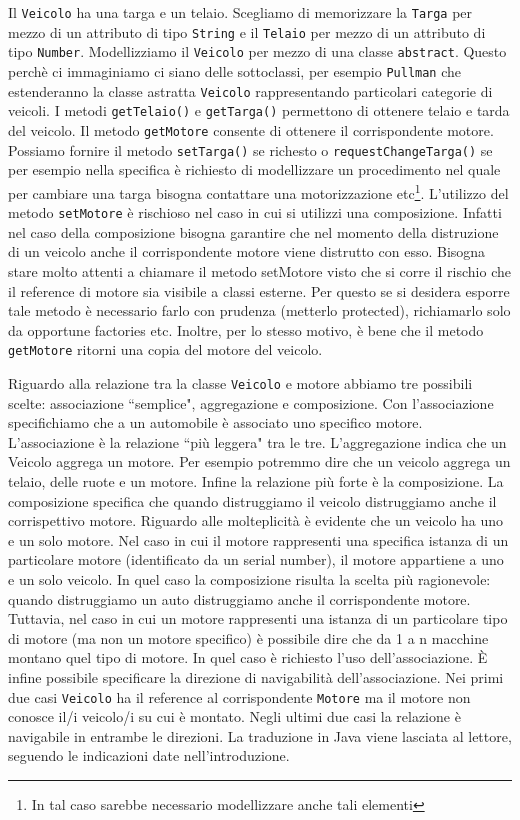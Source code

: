 \documentclass{article}
\begin{document}
Il \texttt{Veicolo} ha una targa e un telaio. Scegliamo di memorizzare la \texttt{Targa} per mezzo di un attributo di tipo \texttt{String} e il \texttt{Telaio} per mezzo di un attributo di tipo \texttt{Number}. Modellizziamo il \texttt{Veicolo} per mezzo di una classe \texttt{abstract}. Questo perch\`e ci immaginiamo ci siano delle sottoclassi, per esempio \texttt{Pullman} che estenderanno la classe astratta \texttt{Veicolo} rappresentando particolari categorie di veicoli. I metodi \texttt{getTelaio()} e \texttt{getTarga()} permettono di ottenere telaio e tarda del veicolo. Il metodo \texttt{getMotore} consente di ottenere il corrispondente motore. Possiamo fornire il metodo \texttt{setTarga()} se richesto o \texttt{requestChangeTarga()} se per esempio nella specifica \`e richiesto di modellizzare un procedimento nel quale per cambiare una targa bisogna contattare una motorizzazione etc\footnote{In tal caso sarebbe necessario modellizzare anche tali elementi}. L'utilizzo del metodo \texttt{setMotore}  \`e rischioso nel caso in cui si utilizzi una composizione. Infatti nel caso della composizione bisogna garantire che nel momento della distruzione di un veicolo anche il corrispondente motore viene distrutto con esso. Bisogna stare molto attenti a chiamare il metodo setMotore visto che si corre il rischio che il reference di motore sia visibile a classi esterne. Per questo se si desidera esporre tale metodo  \`e necessario farlo con prudenza (metterlo protected), richiamarlo solo da opportune factories etc. Inoltre, per lo stesso motivo, \`e bene che il metodo \texttt{getMotore} ritorni una copia del motore del veicolo.

Riguardo alla relazione tra la classe \texttt{Veicolo} e motore abbiamo tre possibili scelte: associazione ``semplice", aggregazione e composizione. Con l'associazione specifichiamo che a un automobile \`e associato uno specifico motore. L'associazione \`e la relazione ``pi\`u leggera" tra le tre. L'aggregazione indica che un Veicolo aggrega un motore. Per esempio potremmo dire che un veicolo aggrega un telaio,  delle ruote e un motore. Infine la relazione pi\`u forte \`e la composizione. La composizione specifica che quando distruggiamo il veicolo distruggiamo anche il corrispettivo motore. Riguardo alle molteplicit\`a \`e evidente che un veicolo ha uno e un solo motore. Nel caso in cui il motore rappresenti una specifica istanza di un particolare motore (identificato da un serial number), il motore appartiene a uno e un solo veicolo. In quel caso la composizione risulta la scelta pi\`u ragionevole: quando distruggiamo un auto distruggiamo anche il corrispondente motore. Tuttavia, nel caso in cui un motore rappresenti una istanza di un particolare tipo di motore (ma non un motore specifico) \`e possibile dire che da 1 a n macchine montano quel tipo di motore. In quel caso \`e richiesto l'uso dell'associazione.  \`E infine possibile specificare la direzione di navigabilit\`a dell'associazione. Nei primi due casi \texttt{Veicolo} ha il reference al corrispondente \texttt{Motore} ma il motore non conosce il/i veicolo/i su cui \`e montato. Negli ultimi due casi la relazione \`e navigabile in entrambe le direzioni. La traduzione in Java viene lasciata al lettore, seguendo le indicazioni date nell'introduzione.
\end{document}
